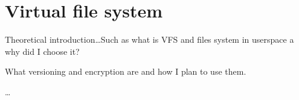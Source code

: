 \chapter{Virtual file system}
\label{chap:refs}

Theoretical introduction\ldots Such as what is VFS and files system in userspace a why did I choose it?

What versioning and encryption are and how I plan to use them.

\ldots